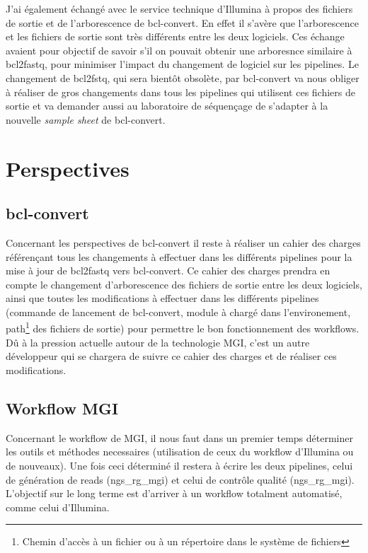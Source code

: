 J'ai également échangé avec le service technique d'Illumina à propos des fichiers de sortie et de l'arborescence de bcl-convert. En effet il s'avère que l'arborescence et les fichiers de sortie sont très différents entre les deux logiciels. Ces échange avaient pour objectif de savoir s'il on pouvait obtenir une arboresnce similaire à bcl2fastq, pour minimiser l'impact du changement de logiciel sur les pipelines. Le changement de bcl2fstq, qui sera bientôt obsolète, par bcl-convert va nous obliger à réaliser de gros changements dans tous les pipelines qui utilisent ces fichiers de sortie et va demander aussi au laboratoire de séquençage de s'adapter à la nouvelle \emph{sample sheet} de bcl-convert.
 
\section{Perspectives}
\subsection{bcl-convert}
Concernant les perspectives de bcl-convert il reste à réaliser un cahier des charges référençant tous les changements à effectuer dans les différents pipelines pour la mise à jour de bcl2fastq vers bcl-convert. Ce cahier des charges prendra en compte le changement d'arborescence des fichiers de sortie entre les deux logiciels, ainsi que toutes les modifications à effectuer dans les différents pipelines (commande de lancement de bcl-convert, module à chargé dans l'environement, path\footnote{Chemin d'accès à un fichier ou à un répertoire dans le système de fichiers} des fichiers de sortie) pour permettre le bon fonctionnement des workflows. Dû à la pression actuelle autour de la technologie MGI, c'est un autre développeur qui se chargera de suivre ce cahier des charges et de réaliser ces modifications.\\

\subsection{Workflow MGI}
Concernant le workflow de MGI, il nous faut dans un premier temps déterminer les outils et méthodes necessaires (utilisation de ceux du workflow d'Illumina ou de nouveaux). Une fois ceci déterminé il restera à écrire les deux pipelines, celui de génération de reads (ngs\_rg\_mgi) et celui de contrôle qualité (ngs\_rg\_mgi). L'objectif sur le long terme est d'arriver à un workflow totalment automatisé, comme celui d'Illumina.\\

